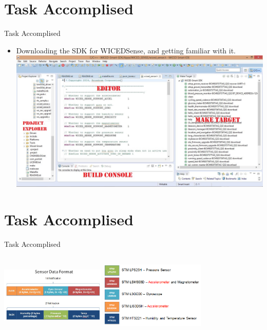 \documentclass[10pt, a4paper]{beamer}
\begin{document}
\section{Task Accomplised}
\begin{frame}{Task Accomplised}
	\begin{itemize}
	   \item Downloading the SDK for WICEDSense, and getting familiar with it.\\
	   \includegraphics[scale=0.2]{Wiced-sdk.JPG}
	\end{itemize}
\end{frame}

\section{Task Accomplised}
\begin{frame}{Task Accomplised}
	
	
	   \includegraphics[width=5cm, height=4cm]{PacketFormat.JPG}
	   \vspace{3mm}
	   \includegraphics[width=5cm, height=4cm]{Sensors.png}
	
\end{frame}
\end{document}
